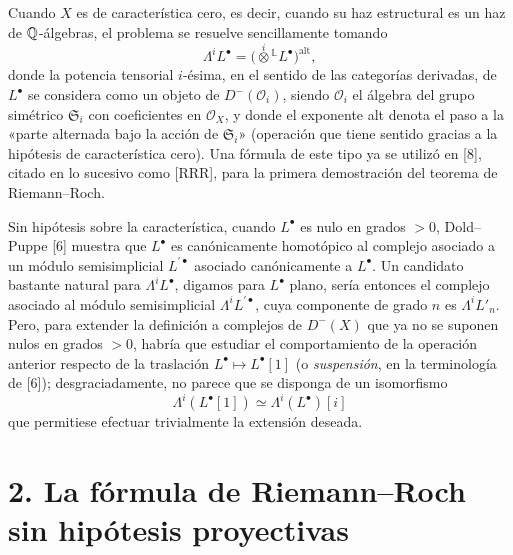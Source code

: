 Cuando $X$ es de característica cero, es decir, cuando su haz estructural es
un haz de $\mathbb Q$-álgebras, el problema se resuelve sencillamente tomando
\begin{equation}\tag{1.2}
\Lambda^i L^\bullet=\bigl(\overset{i}{\otimes}{}^{\mathbb L}L^\bullet\bigr)^{\mathrm{alt}},
\end{equation}
donde la potencia tensorial $i$-ésima, en el sentido de las categorías
derivadas, de $L^\bullet$ se considera como un objeto de
$D^-(\mathcal O_i)$, siendo $\mathcal O_i$ el álgebra del grupo simétrico
$\mathfrak S_i$ con coeficientes en $\mathcal O_X$, y donde el exponente
alt denota el paso a la «parte alternada bajo la acción de
$\mathfrak S_i$» (operación que tiene sentido gracias a la hipótesis de
característica cero). Una fórmula de este tipo ya se utilizó en [8], citado
en lo sucesivo como [RRR], para la primera demostración del teorema de
Riemann--Roch.

Sin hipótesis sobre la característica, cuando $L^\bullet$ es nulo en grados
$>0$, Dold--Puppe [6] muestra que $L^\bullet$ es canónicamente homotópico al
complejo asociado a un módulo semisimplicial $L^{\prime\bullet}$ asociado
canónicamente a $L^\bullet$. Un candidato bastante natural para
$\Lambda^iL^\bullet$, digamos para $L^\bullet$ plano, sería entonces el
complejo asociado al módulo semisimplicial $\Lambda^iL^{\prime\bullet}$,
cuya componente de grado $n$ es $\Lambda^iL'_n$. Pero, para extender la
definición a complejos de $D^-(X)$ que ya no se suponen nulos en grados
$>0$, habría que estudiar el comportamiento de la operación anterior
respecto de la traslación $L^\bullet\mapsto L^\bullet[1]$ (o
\emph{suspensión}, en la terminología de [6]); desgraciadamente, no parece
que se disponga de un isomorfismo
\[
\Lambda^i(L^\bullet[1])\simeq \Lambda^i(L^\bullet)[i]
\]
que permitiese efectuar trivialmente la extensión deseada.

\section*{2. La fórmula de Riemann--Roch sin hipótesis proyectivas}

